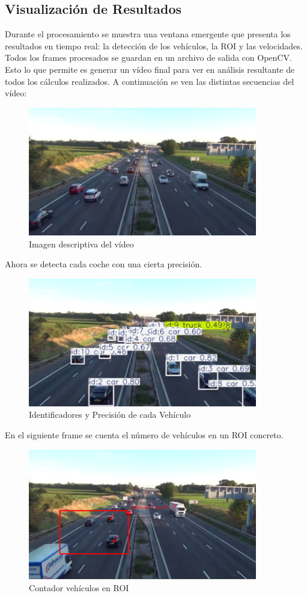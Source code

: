 \subsection{Visualización de Resultados}
Durante el procesamiento se muestra una ventana emergente que presenta los resultados en tiempo real: la detección de los vehículos, la ROI y las velocidades. Todos los frames procesados se guardan en un archivo de 
salida con OpenCV.  Esto lo que permite es generar un vídeo final para ver en análisis 
resultante de todos los cálculos realizados.
A continuación se ven las distintas secuencias del vídeo:
\begin{figure}[h!]
    \centering
    \includegraphics[width = 10cm]{ImagenesLatex/im1.png}{}
    \caption{Imagen descriptiva del vídeo}
    \label{fig:enter-label}
\end{figure}
Ahora se detecta cada coche con una cierta precisión.
\begin{figure}[h!]
    \centering
    \includegraphics[width = 10cm]{ImagenesLatex/im2.png}{}
    \caption{Identificadores y Precisión de cada Vehículo}
    \label{fig:enter-label}
\end{figure}
En el siguiente frame se cuenta el número de vehículos en un ROI concreto.
\begin{figure}[h!]
    \centering
    \includegraphics[width = 10cm]{ImagenesLatex/im3.png}{}
    \caption{Contador vehículos en ROI}
    \label{fig:enter-label}
\end{figure}
